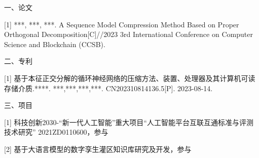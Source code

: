 \begin{publications}


{\heiti 一、论文}

[1] ***, ***, ***. A Sequence Model Compression Method Based on Proper Orthogonal Decomposition[C]//2023 3rd International Conference on Computer Science and Blockchain (CCSB). 

{\heiti 二、专利}

[1] 基于本征正交分解的循环神经网络的压缩方法、装置、处理器及其计算机可读存储介质.****. ***,***,***,***. CN202310814136.5[P]. 2023-08-14.


{\heiti 三、项目}

[1] 科技创新2030-“新一代人工智能”重大项目“人工智能平台互联互通标准与评测技术研究” 2021ZD0110600，参与

[2] 基于大语言模型的数字孪生灌区知识库研究及开发，参与


\end{publications}
